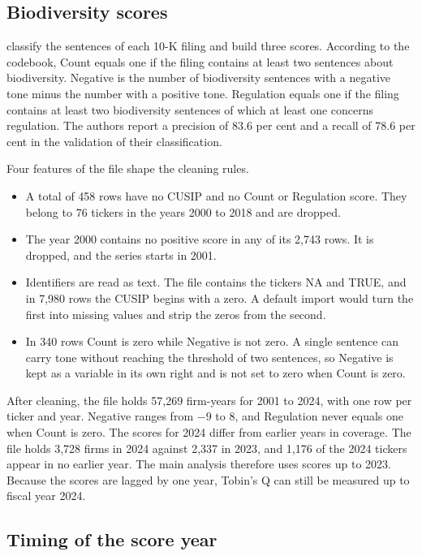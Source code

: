 \documentclass[12pt,a4paper]{article}
\begin{document}
\subsection{Biodiversity scores}

\citet{giglio2026} classify the sentences of each 10-K filing and build three scores. According to the codebook, Count equals one if the filing contains at least two sentences about biodiversity. Negative is the number of biodiversity sentences with a negative tone minus the number with a positive tone. Regulation equals one if the filing contains at least two biodiversity sentences of which at least one concerns regulation. The authors report a precision of 83.6 per cent and a recall of 78.6 per cent in the validation of their classification.

Four features of the file shape the cleaning rules.

\begin{itemize}
\item A total of 458 rows have no CUSIP and no Count or Regulation score. They belong to 76 tickers in the years 2000 to 2018 and are dropped.
\item The year 2000 contains no positive score in any of its 2,743 rows. It is dropped, and the series starts in 2001.
\item Identifiers are read as text. The file contains the tickers NA and TRUE, and in 7,980 rows the CUSIP begins with a zero. A default import would turn the first into missing values and strip the zeros from the second.
\item In 340 rows Count is zero while Negative is not zero. A single sentence can carry tone without reaching the threshold of two sentences, so Negative is kept as a variable in its own right and is not set to zero when Count is zero.
\end{itemize}

After cleaning, the file holds 57,269 firm-years for 2001 to 2024, with one row per ticker and year. Negative ranges from $-9$ to 8, and Regulation never equals one when Count is zero. The scores for 2024 differ from earlier years in coverage. The file holds 3,728 firms in 2024 against 2,337 in 2023, and 1,176 of the 2024 tickers appear in no earlier year. The main analysis therefore uses scores up to 2023. Because the scores are lagged by one year, Tobin's Q can still be measured up to fiscal year 2024.

\subsection{Timing of the score year}
\end{document}
